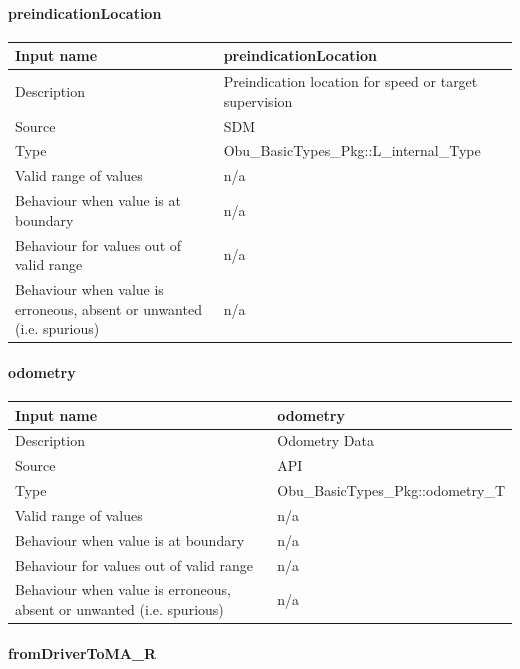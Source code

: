 \paragraph{preindicationLocation}

\begin{longtable}{p{}p{}}
\toprule
Input name				& preindicationLocation\\
\midrule
Description				& Preindication location for speed or target supervision \\
\midrule
Source					& SDM \\ 
\midrule
Type					& Obu\_BasicTypes\_Pkg::L\_internal\_Type\\
\midrule
Valid range of values	& n/a \\
\midrule
Behaviour when value is at boundary	& n/a\\
\midrule
Behaviour for values out of valid range	& n/a\\
\midrule
Behaviour when value is erroneous, absent or unwanted (i.e. spurious) & n/a\\

\bottomrule


\end{longtable}

\paragraph{odometry}

\begin{longtable}{p{}p{}}
\toprule
Input name				& odometry\\
\midrule
Description				& Odometry Data  \\
\midrule
Source					& API \\ 
\midrule
Type					& Obu\_BasicTypes\_Pkg::odometry\_T\\
\midrule
Valid range of values	& n/a \\
\midrule
Behaviour when value is at boundary	& n/a\\
\midrule
Behaviour for values out of valid range	& n/a\\
\midrule
Behaviour when value is erroneous, absent or unwanted (i.e. spurious) & n/a\\

\bottomrule


\end{longtable}

\paragraph{fromDriverToMA\_R}

